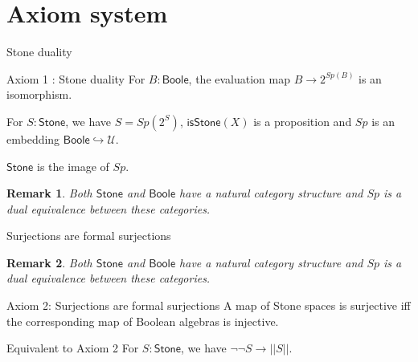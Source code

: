 \documentclass{beamer}
\newcommand{\Type}{\mathcal U}
\newcommand{\Boole}{\mathsf{Boole}}
\newcommand{\Stone}{\mathsf{Stone}}
\newcommand{\isSt}{\mathsf{isStone}}
\newtheorem{remark}{Remark}
\begin{document}
\section{Axiom system}
\begin{frame}{Stone duality}
  \begin{block}{Axiom 1 : Stone duality}
    For $B:\Boole$, the evaluation map $B \to 2^{Sp(B)}$ is an isomorphism. 
  \end{block}
  \pause
  \begin{corollary}
    For $S:\Stone$, we have $S = Sp(2^S)$,
    \pause 
    $\isSt(X)$ is a proposition \pause and
    $Sp$ is an embedding $\Boole \hookrightarrow \Type$. 
  \end{corollary}
  \pause
  \begin{definition}
    $\Stone$ is the image of $Sp$. 
  \end{definition}
  \pause
  \begin{remark}
    Both $\Stone$ and $\Boole$ have a natural category structure and $Sp$
    is a dual equivalence between these categories. 
  \end{remark}
\end{frame}



\begin{frame}{Surjections are formal surjections}
  \begin{remark}
    Both $\Stone$ and $\Boole$ have a natural category structure and $Sp$
    is a dual equivalence between these categories. 
  \end{remark}
  \pause
  \begin{block}{Axiom 2: Surjections are formal surjections}
    A map of Stone spaces is surjective iff the corresponding map of Boolean algebras is injective. 
  \end{block}
  \pause
  \begin{block}{Equivalent to Axiom 2}
    For $S:\Stone$, we have $\neg \neg S \to || S||$. 
  \end{block}
\end{frame}
\end{document}
